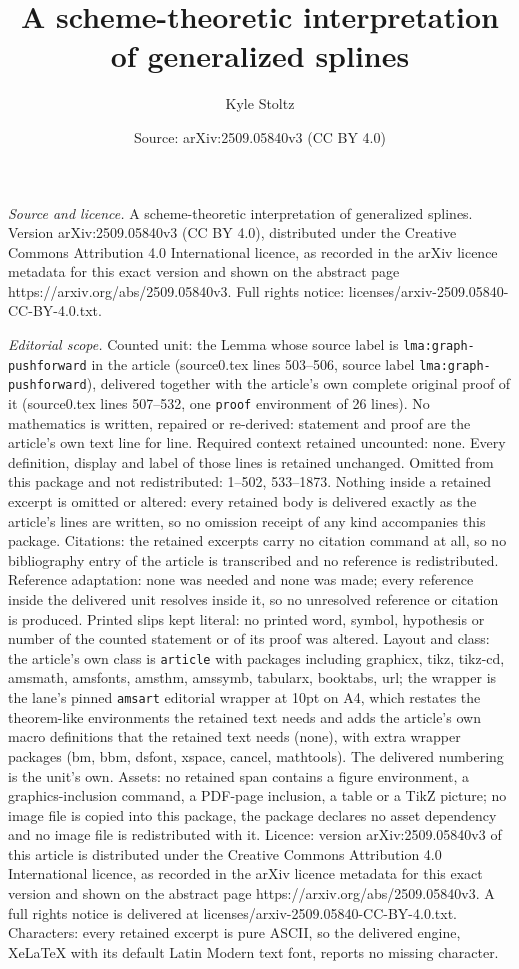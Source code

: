 \documentclass[10pt,a4paper]{amsart}
\title[A scheme-theoretic interpretation of generalized splines]{A scheme-theoretic interpretation of generalized splines}
\author{Kyle Stoltz}
\date{Source: arXiv:2509.05840v3 (CC BY 4.0)}
\begin{document}
\maketitle

\noindent\emph{Source and licence.} A scheme-theoretic interpretation of generalized splines. Version arXiv:2509.05840v3 (CC BY 4.0), distributed under the Creative Commons Attribution 4.0 International licence, as recorded in the arXiv licence metadata for this exact version and shown on the abstract page https://arxiv.org/abs/2509.05840v3. Full rights notice: licenses/arxiv-2509.05840-CC-BY-4.0.txt.\par\smallskip

\noindent\textit{Editorial scope.} Counted unit: the Lemma whose source label is \texttt{lma:graph-pushforward} in the article (source0.tex lines 503--506, source label \texttt{lma:graph-pushforward}), delivered together with the article's own complete original proof of it (source0.tex lines 507--532, one \texttt{proof} environment of 26 lines). No mathematics is written, repaired or re-derived: statement and proof are the article's own text line for line. Required context retained uncounted: none. Every definition, display and label of those lines is retained unchanged. Omitted from this package and not redistributed: 1--502, 533--1873. Nothing inside a retained excerpt is omitted or altered: every retained body is delivered exactly as the article's lines are written, so no omission receipt of any kind accompanies this package. Citations: the retained excerpts carry no citation command at all, so no bibliography entry of the article is transcribed and no reference is redistributed. Reference adaptation: none was needed and none was made; every reference inside the delivered unit resolves inside it, so no unresolved reference or citation is produced. Printed slips kept literal: no printed word, symbol, hypothesis or number of the counted statement or of its proof was altered. Layout and class: the article's own class is \texttt{article} with packages including graphicx, tikz, tikz-cd, amsmath, amsfonts, amsthm, amssymb, tabularx, booktabs, url; the wrapper is the lane's pinned \texttt{amsart} editorial wrapper at 10pt on A4, which restates the theorem-like environments the retained text needs and adds the article's own macro definitions that the retained text needs (none), with extra wrapper packages (bm, bbm, dsfont, xspace, cancel, mathtools). The delivered numbering is the unit's own. Assets: no retained span contains a figure environment, a graphics-inclusion command, a PDF-page inclusion, a table or a TikZ picture; no image file is copied into this package, the package declares no asset dependency and no image file is redistributed with it. Licence: version arXiv:2509.05840v3 of this article is distributed under the Creative Commons Attribution 4.0 International licence, as recorded in the arXiv licence metadata for this exact version and shown on the abstract page https://arxiv.org/abs/2509.05840v3. A full rights notice is delivered at licenses/arxiv-2509.05840-CC-BY-4.0.txt. Characters: every retained excerpt is pure ASCII, so the delivered engine, XeLaTeX with its default Latin Modern text font, reports no missing character.
\end{document}
